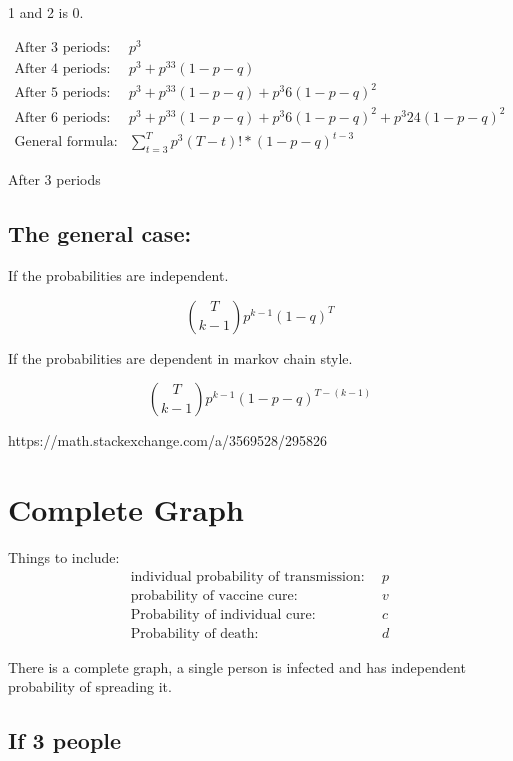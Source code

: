 \documentclass[12pt]{report}
\numberwithin{equation}{section}
\begin{document}
1 and 2 is 0. 

\begin{align}
\text{After 3 periods}:& p^3 \\
\text{After 4 periods}:& p^3 + p^33(1-p-q) \\
\text{After 5 periods}:& p^3 + p^33(1-p-q) + p^3 6(1-p-q)^2 \\
\text{After 6 periods}:& p^3 + p^33(1-p-q) + p^3 6(1-p-q)^2 + p^3 24(1-p-q)^2 \\
\text{General formula}:& \sum_{t=3}^{T}p^{3}(T-t)!*(1-p-q)^{t-3}
\end{align}

After 3 periods

\subsection{The general case:}

If the probabilities are independent. 

\begin{equation}
\binom{T}{k-1}p^{k-1}(1-q)^T
\end{equation}

If the probabilities are dependent in markov chain style. 

\begin{equation}
\binom{T}{k-1}p^{k-1} (1-p-q)^{T-(k-1)}
\end{equation}

https://math.stackexchange.com/a/3569528/295826



\section{Complete Graph }

Things to include: 
\begin{align}
\text{individual probability of transmission:}& ~~p \\
\text{probability of vaccine cure:}& ~~v \\
\text{Probability of individual cure:}& ~~c \\
\text{Probability of death:}& ~~d
\end{align}

There is a complete graph, a single person is infected and has independent probability of spreading it. 

\subsection{If 3 people}
\end{document}
